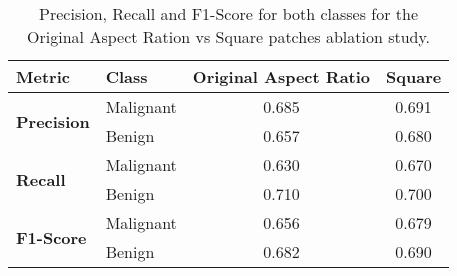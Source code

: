 \begin{table}[htbp]
    \centering
    \begin{tabular}{llcc}
        \toprule
        \textbf{Metric} & \textbf{Class} & \textbf{Original Aspect Ratio} & \textbf{Square} \\
        \midrule
        \multirow{2}{*}{\textbf{Precision}} & Malignant & 0.685 & 0.691 \\
        & Benign    & 0.657 & 0.680 \\
        \midrule
        \multirow{2}{*}{\textbf{Recall}}    & Malignant & 0.630 & 0.670 \\
        & Benign    & 0.710 & 0.700 \\
        \midrule
        \multirow{2}{*}{\textbf{F1-Score}}  & Malignant & 0.656 & 0.679 \\
        & Benign    & 0.682 & 0.690 \\
        \bottomrule
    \end{tabular}
    \caption{Precision, Recall and F1-Score for both classes for the Original Aspect Ration vs Square patches ablation study.}
    \label{tab:ablation-patches}
\end{table}